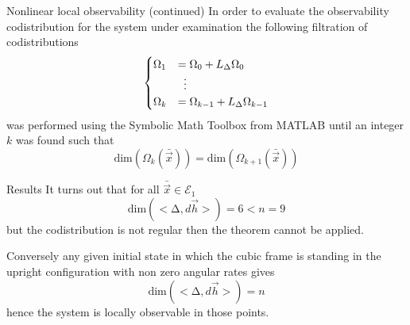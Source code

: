 \begin{frame}{Nonlinear local observability (continued)}
In order to evaluate the observability codistribution for the system under examination
 the following filtration of codistributions
\[
\begin{cases}
\Omega_1 &= \Omega_0 + L_\Delta \Omega_0\\
&\vdotswithin{=} \\
\Omega_k &= \Omega_{k-1} + L_\Delta \Omega_{k-1}
\end{cases}
\]
was performed using the Symbolic Math Toolbox from MATLAB until an integer $k$ was found such that
\[
\mathrm{dim}(\Omega_{k}(\bar{\vec{x}})) = \mathrm{dim}(\Omega_{k + 1}(\bar{\vec{x}}))
\]
\end{frame}

\begin{frame}{Results}
It turns out that for all $\bar{\vec{x}} \in \mathcal{E}_{1}$
\[
\mathrm{dim} (<\mathrm{\Delta},d\vec{h}>) = 6 < n = 9
\]
but the codistribution is \alert{not} regular then the theorem cannot be applied.

Conversely any given initial state in which the cubic frame is standing in the upright
configuration with \alert{non zero angular rates} gives
\[
\mathrm{dim} (<\mathrm{\Delta},d\vec{h}>) = n
\]
hence the system \alert{is locally observable} in those points.    
\end{frame}

